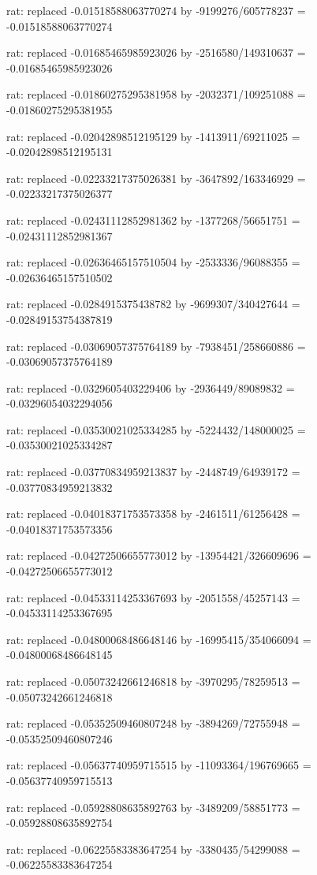 \documentclass[a4paper,10pt]{article}
\begin{document}
\begin{eulernotebook}
\begin{eulercomment}
\begin{eulercomment}
\begin{eulercomment}
\begin{eulercomment}
\begin{eulercomment}
\begin{eulercomment}
\begin{eulercomment}
\begin{eulercomment}
\begin{eulercomment}
\begin{eulercomment}
\begin{eulercomment}
\begin{eulercomment}
\begin{eulercomment}
\begin{eulercomment}
\begin{eulercomment}
\begin{eulercomment}
\begin{euleroutput}
  rat: replaced -0.01518588063770274 by -9199276/605778237 = -0.01518588063770274
  
  rat: replaced -0.01685465985923026 by -2516580/149310637 = -0.01685465985923026
  
  rat: replaced -0.01860275295381958 by -2032371/109251088 = -0.01860275295381955
  
  rat: replaced -0.02042898512195129 by -1413911/69211025 = -0.02042898512195131
  
  rat: replaced -0.02233217375026381 by -3647892/163346929 = -0.02233217375026377
  
  rat: replaced -0.02431112852981362 by -1377268/56651751 = -0.02431112852981367
  
  rat: replaced -0.02636465157510504 by -2533336/96088355 = -0.02636465157510502
  
  rat: replaced -0.0284915375438782 by -9699307/340427644 = -0.02849153754387819
  
  rat: replaced -0.03069057375764189 by -7938451/258660886 = -0.03069057375764189
  
  rat: replaced -0.0329605403229406 by -2936449/89089832 = -0.03296054032294056
  
  rat: replaced -0.03530021025334285 by -5224432/148000025 = -0.03530021025334287
  
  rat: replaced -0.03770834959213837 by -2448749/64939172 = -0.03770834959213832
  
  rat: replaced -0.04018371753573358 by -2461511/61256428 = -0.04018371753573356
  
  rat: replaced -0.04272506655773012 by -13954421/326609696 = -0.04272506655773012
  
  rat: replaced -0.04533114253367693 by -2051558/45257143 = -0.04533114253367695
  
  rat: replaced -0.04800068486648146 by -16995415/354066094 = -0.04800068486648145
  
  rat: replaced -0.05073242661246818 by -3970295/78259513 = -0.05073242661246818
  
  rat: replaced -0.05352509460807248 by -3894269/72755948 = -0.05352509460807246
  
  rat: replaced -0.05637740959715515 by -11093364/196769665 = -0.05637740959715513
  
  rat: replaced -0.05928808635892763 by -3489209/58851773 = -0.05928808635892754
  
  rat: replaced -0.06225583383647254 by -3380435/54299088 = -0.06225583383647254
  

\end{euleroutput}
\end{eulercomment}
\end{eulercomment}
\end{eulercomment}
\end{eulercomment}
\end{eulercomment}
\end{eulercomment}
\end{eulercomment}
\end{eulercomment}
\end{eulercomment}
\end{eulercomment}
\end{eulercomment}
\end{eulercomment}
\end{eulercomment}
\end{eulercomment}
\end{eulercomment}
\end{eulercomment}
\end{eulernotebook}
\end{document}
